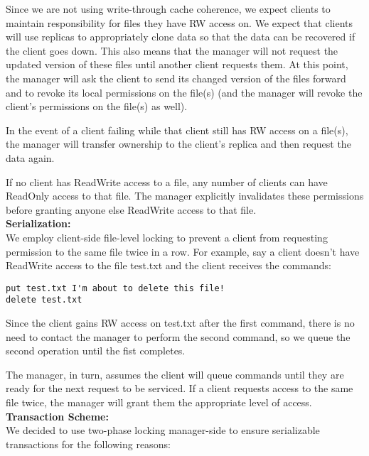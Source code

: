 \documentclass[11pt]{article}
\begin{document}
Since we are not using write-through cache coherence, we expect clients to maintain responsibility for files they have RW access on. 
We expect that clients will use replicas to appropriately clone data so that the data can be recovered if the client goes down. This
also means that the manager will not request the updated version of these files until another client requests them. At this point,
the manager will ask the client to send its changed version of the files forward and to revoke its local permissions on the file(s) (and
the manager will revoke the client's permissions on the file(s) as well).

In the event of a client failing while that client still has RW access on a file(s), the manager will transfer ownership to the client's
replica and then request the data again.

If no client has ReadWrite access to a file, any number of clients can have ReadOnly access to that file.
The manager explicitly invalidates these permissions before granting anyone else ReadWrite access to that file. \\

\textbf{Serialization:} \\

We employ client-side file-level locking to prevent a client from requesting permission to the same file twice in a row.
For example, say a client doesn't have ReadWrite access to the file test.txt and the client receives the commands:

\begin{verbatim}
put test.txt I'm about to delete this file!
delete test.txt
\end{verbatim}

Since the client gains RW access on test.txt after the first command, there is no need to contact the manager to perform the second command, so we queue the second operation until the fist completes.

The manager, in turn, assumes the client will queue commands until they are ready for the next request to be serviced. 
If a client requests access to the same file twice, the manager will grant them
the appropriate level of access. \\

\textbf{Transaction Scheme:} \\

We decided to use two-phase locking manager-side to ensure serializable transactions for the following reasons:
\end{document}
